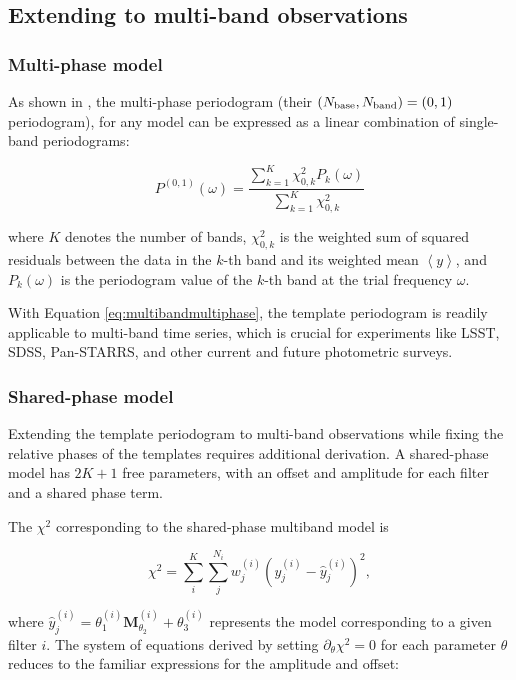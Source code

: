 \documentclass[apj]{emulateapj}
\newcommand{\savg}[1]{\left<#1\right>}
\newcommand{\hatyij}{\hat{y}^{(i)}_j}
\newcommand{\yij}{y^{(i)}_j}
\newcommand{\thta}[1]{\theta_{#1}^{(i)}}
\newcommand{\Mshftijsp}{\mathbf{M}_{\theta_2}^{(i)}}
\begin{document}
\subsection{Extending to multi-band observations}

\subsubsection{Multi-phase model}
\label{sec:multiband}
As shown in \cite{Vanderplas+Ivezic_2015}, the multi-phase periodogram (their 
$(N_{\rm base}, N_{\rm band}) = (0, 1)$ periodogram), for any model can
be expressed as a linear combination of single-band periodograms:

\begin{equation}
\label{eq:multibandmultiphase}
P^{(0,1)}(\omega) = \frac{\sum_{k=1}^K\chi^2_{0, k}P_{k}(\omega)}{\sum_{k=1}^K\chi^2_{0,k}}
\end{equation} 

\noindent where $K$ denotes the number of bands, $\chi^2_{0,k}$ is the weighted sum of squared
residuals between the data in the $k$-th band and its weighted mean $\savg{y}$, and $P_k(\omega)$ is
the periodogram value of the $k$-th band at the trial frequency $\omega$. 

With Equation \ref{eq:multibandmultiphase}, the template periodogram is readily applicable to multi-band 
time series, which is crucial for experiments like LSST, SDSS, Pan-STARRS, and other current 
and future photometric surveys.

\subsubsection{Shared-phase model}
Extending the template periodogram to multi-band observations while fixing the
relative phases of the templates requires additional derivation. A shared-phase
model has $2K + 1$ free parameters, with an offset and amplitude for each filter 
and a shared phase term.

The $\chi^2$ corresponding to the shared-phase multiband model is

\begin{equation}
\label{eq:chi2sharedphase}
\chi^2 = \sum_i^K\sum_j^{N_i} w_j^{(i)}(\yij - \hatyij)^2,
\end{equation}

\noindent where $\hatyij = \thta{1}\Mshftijsp + \thta{3}$ represents the model corresponding to a given
filter $i$. The system of equations derived by setting $\partial_\theta \chi^2 = 0$ for each parameter $\theta$
reduces to the familiar expressions for the amplitude and offset:
\end{document}
